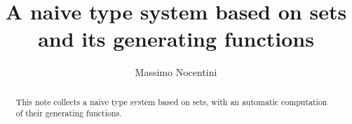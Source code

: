 \documentclass[a4paper,12pt]{article}
\author{Massimo Nocentini}
\title{A naive type system based on sets and its generating functions}
\begin{document}
\maketitle

\begin{abstract}
This note collects a naive type system based on sets, with an automatic
computation of their generating functions.
\end{abstract}





\end{document}

